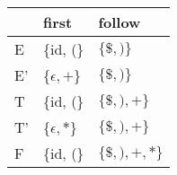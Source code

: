 \documentclass{standalone}
\providecommand\lightrule{%
	\arrayrulecolor{black!30}%
	\midrule[\lightrulewidth]%
	\arrayrulecolor{black}}
\begin{document}
\begin{tabularx}{\textwidth}{XXX}
    & first & follow\\
    \midrule
        E
        &
        \{id, (\}
        &
        \(\{\$, )\}\)
        \\ \lightrule
        E'
        &
        \{\(\epsilon, +\)\}
        &
        \(\{\$, )\}\)
        \\ \lightrule
        T
        &
        \{id, (\}
        &
        \(\{\$, ), +\}\)
        \\ \lightrule
        T'
        &
        \{\(\epsilon, *\)\}
        &
        \(\{\$, ), +\}\)
        \\ \lightrule
        F
        &
        \{id, (\}
        &
        \(\{\$, ), +, *\}\)
\end{tabularx}
\end{document}
